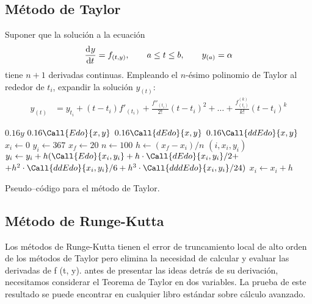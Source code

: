 \documentclass[english,spanish,Ce-table,Ce-theorem]{CabesHW}
\begin{document}
\subsection{Método de Taylor}
Suponer que la solución a la ecuación
\[ \td{y}{t} = f_{(t,y)}, \qquad a \leq t \leq b, \qquad y_{(a)} = \alpha \]
tiene $n+1$ derivadas continuas. Empleando el $n$-ésimo polinomio de Taylor al rededor de $t_i$, expandir la solución $y_{(t)}$:
\begin{align*}
    y_{(t)} &= y_{t_i} + (t-t_i)f'_{(t_i)} + \frac{f''_{(t_i)}}{2!}(t-t_i)^2 + \ldots + \frac{f^{(k)}_{(t_i)}}{k!}(t-t_i)^k
\end{align*}

\begin{algorithm}[H]
    \centering
    \begin{myalg}[1]
     
        \State \Output $0.16 y$
    \EndFunction
    \State \phantom{}
     
        \State \Output $0.16 \Call{Edo}{x,y}$
    \EndFunction
    \State \phantom{}
     
        \State \Output $0.16 \Call{dEdo}{x,y}$
    \EndFunction
    \State \phantom{}
     
        \State \Output $0.16 \Call{ddEdo}{x,y}$
    \EndFunction
    \State \phantom{}
    \State $x_i \gets 0$ 
    \State $y_i \gets 367$ 
    \State $x_f \gets 20$ 
    \State $n \gets 100$ 
    \State \phantom{}
    \State $h \gets (x_f - x_i)/n$ 
        \State \Output $(i, x_i, y_i)$
        \State \phantom{}
        \State $y_i \gets y_i + h(\Call{Edo}{x_i, y_i} + h\cdot\Call{dEdo}{x_i, y_i}/2 + $
        \Statex \hspace{5em}$+ h^2\cdot\Call{ddEdo}{x_i, y_i}/6 + h^3\cdot\Call{dddEdo}{x_i, y_i}/24)$
        \State $x_i \gets x_i + h$
    \EndFor
    \end{myalg}
    \caption{Pseudo--código para el método de Taylor.}
    \label{alg:taylor}
\end{algorithm}

\subsection{Método de Runge-Kutta}
Los métodos de Runge-Kutta tienen el error de truncamiento local de alto orden de los métodos de Taylor pero elimina la necesidad de calcular y evaluar las derivadas de f (t, y). antes de presentar las ideas detrás de su derivación, necesitamos considerar el Teorema de Taylor en dos variables. La prueba de este resultado se puede encontrar en cualquier libro estándar sobre cálculo avanzado.
\end{document}
